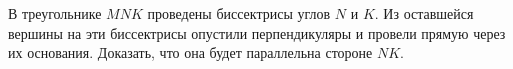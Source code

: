 \begin{itemize}

\itC В треугольнике $MNK$ проведены биссектрисы углов $N$ и $K$. Из оставшейся вершины на эти биссектрисы 
опустили перпендикуляры и провели прямую через их основания. Доказать, что она будет параллельна стороне $NK$.


\end{itemize}
